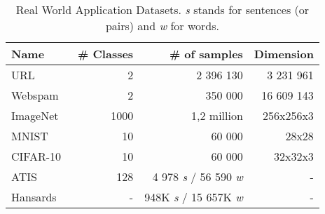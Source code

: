 \documentclass{article}
\begin{document}
\begin{table}[b]
	\centering
	\begin{tabular}{ @{} l | r | r | r @{} }
		\toprule
		Name & \# Classes & \# of samples & Dimension \\
		\midrule 
		URL~\cite{ma2009identifying} & 2 & 2 396 130 & 3 231 961 \\
		Webspam~\cite{webb2006introducing} & 2 &  350 000 & 16 609 143 \\
		\midrule 
		ImageNet~\cite{russakovsky2015imagenet} & 1000 & 1,2 million & 256x256x3\\
		MNIST~\cite{lecun2010mnisthandwrittendigit} & 10 & 60 000 & 28x28 \\
		CIFAR-10~\cite{krizhevsky2009learning} & 10 & 60 000 & 32x32x3 \\
		\midrule
		ATIS~\cite{hemphill1990atis} & 128 & 4 978 \textit{s} / 56 590 \textit{w} & - \\
		\midrule
		Hansards~\cite{hansards} & - & 948K \textit{s} / 15 657K \textit{w} & - \\
		\bottomrule
	\end{tabular}
	\caption{Real World Application Datasets. \textit{s} stands for sentences (or pairs) and \textit{w} for words. }
	\label{tbl:DataSets}

\end{table}
\end{document}
